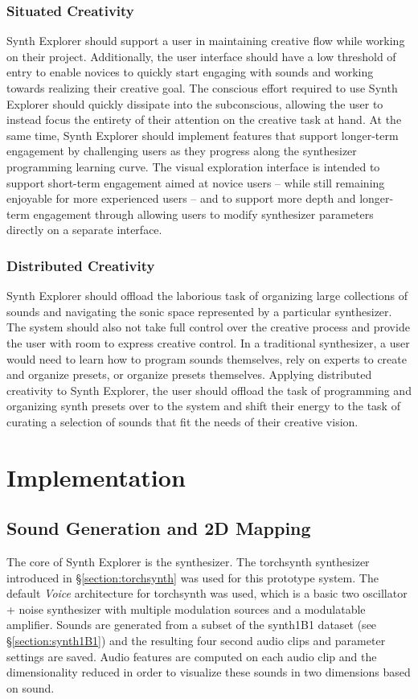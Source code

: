 \subsubsection{Situated Creativity}
Synth Explorer should support a user in maintaining creative flow while working on their project. Additionally, the user interface should have a low threshold of entry to enable novices to quickly start engaging with sounds and working towards realizing their creative goal. The conscious effort required to use Synth Explorer should quickly dissipate into the subconscious, allowing the user to instead focus the entirety of their attention on the creative task at hand. At the same time, Synth Explorer should implement features that support longer-term engagement by challenging users as they progress along the synthesizer programming learning curve. The visual exploration interface is intended to support short-term engagement aimed at novice users -- while still remaining enjoyable for more experienced users -- and to support more depth and longer-term engagement through allowing users to modify synthesizer parameters directly on a separate interface.

\subsubsection{Distributed Creativity}
Synth Explorer should offload the laborious task of organizing large collections of sounds and navigating the sonic space represented by a particular synthesizer. The system should also not take full control over the creative process and provide the user with room to express creative control. In a traditional synthesizer, a user would need to learn how to program sounds themselves, rely on experts to create and organize presets, or organize presets themselves. Applying distributed creativity to Synth Explorer, the user should offload the task of programming and organizing synth presets over to the system and shift their energy to the task of curating a selection of sounds that fit the needs of their creative vision.

\section{Implementation}
\subsection{Sound Generation and 2D Mapping}
The core of Synth Explorer is the synthesizer. The torchsynth synthesizer introduced in \S\ref{section:torchsynth} was used for this prototype system. The default \textit{Voice} architecture for torchsynth was used, which is a basic two oscillator + noise synthesizer with multiple modulation sources and a modulatable amplifier. Sounds are generated from a subset of the synth1B1 dataset (see \S\ref{section:synth1B1}) and the resulting four second audio clips and parameter settings are saved. Audio features are computed on each audio clip and the dimensionality reduced in order to visualize these sounds in two dimensions based on sound.


